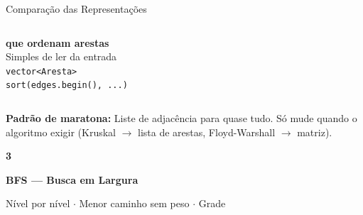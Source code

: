 \documentclass[aspectratio=169,10pt]{beamer}
\begin{document}
\begin{frame}{Comparação das Representações}
\begin{columns}[t]
\begin{tcolorbox}[caixaLaranja,title={Lista de Arestas}]
        \textbf{que ordenam arestas}\\[3pt]
        Simples de ler da entrada\\[3pt]
        \texttt{vector<Aresta>}\\
        \texttt{sort(edges.begin(), ...)}
      \end{tcolorbox}
  \end{columns}
  \vspace{0.10cm}
  \begin{tcolorbox}[caixaAmarelo,title={Regra de ouro}]
    \footnotesize
    \textbf{Padrão de maratona:} Liste de adjacência para quase tudo.
    Só mude quando o algoritmo exigir (Kruskal $\to$ lista de arestas,
    Floyd-Warshall $\to$ matriz).
  \end{tcolorbox}
\end{frame}

{
\begin{frame}[noframenumbering]
  \centering\vspace{1.2cm}
  {\fontsize{38}{46}\selectfont\bfseries\color{gemaBlue} 3}\par
  \vspace{0.25cm}
  {\Large\color{queueColor}\bfseries BFS --- Busca em Largura}\par
  \vspace{0.15cm}
  {\color{gray}\small Nível por nível $\cdot$ Menor caminho sem peso $\cdot$ Grade}
\end{frame}
}
\end{document}
